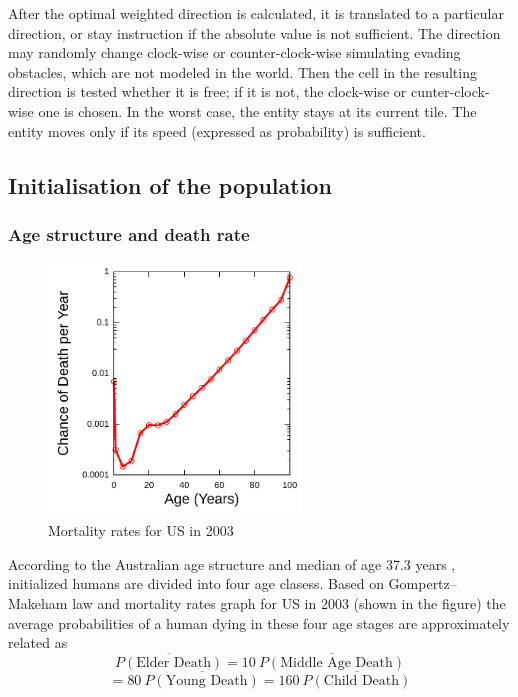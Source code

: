\documentclass[a4paper]{article}
\newcommand*\mean[1]{\overline{#1}}
\begin{document}
After the optimal weighted direction is calculated, it is translated to a particular direction, or stay instruction if the absolute value is not sufficient.
The direction may randomly change clock-wise or counter-clock-wise simulating evading obstacles, which are not modeled in the world.
Then the cell in the resulting direction is tested whether it is free; if it is not, the clock-wise or cunter-clock-wise one is chosen.
In the worst case, the entity stays at its current tile.
The entity moves only if its speed (expressed as probability) is sufficient.

\subsection{Initialisation of the population}

\subsubsection{Age structure and death rate}

\begin{figure}[ht]
    \centering
    \includegraphics[width=0.6\textwidth]{USGompertzCurve}
    \caption{Mortality rates for US in 2003}
\end{figure}

According to the Australian age structure\cite{agestructure} and median of age 37.3 years \cite{demographicsaustralia}, initialized humans are divided into four age clasess.
Based on Gompertz–Makeham law \cite{mortalitylaw} and mortality rates graph for US in 2003 (shown in the figure) the average probabilities of a human dying in these four age stages are approximately related as 
$$ \mean{P(\text{Elder Death})} = 10\: \mean{P(\text{Middle Age Death})} $$
$$ = 80\: \mean{P(\text{Young Death})} = 160\: \mean{P(\text{Child Death})} $$
\end{document}
